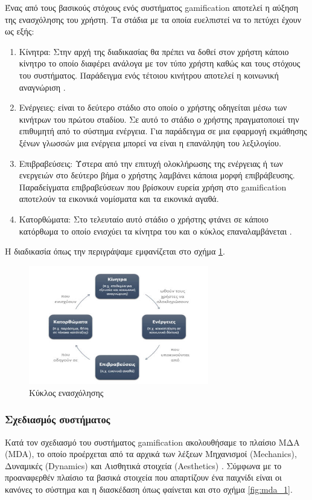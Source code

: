 		Ένας από τους βασικούς στόχους ενός συστήματος gamification αποτελεί η αύξηση της ενασχόλησης του χρήστη. Τα στάδια με τα οποία ευελπιστεί να το πετύχει έχουν ως εξής:
		\begin{enumerate}
			\item Κίνητρα: Στην αρχή της διαδικασίας θα πρέπει να δοθεί στον χρήστη κάποιο κίνητρο το οποίο διαφέρει ανάλογα με τον τύπο χρήστη καθώς και τους στόχους του συστήματος. Παράδειγμα ενός τέτοιου κινήτρου αποτελεί η κοινωνική αναγνώριση \cite{Gamification_on_Participation}.
			\item Ενέργειες: είναι το δεύτερο στάδιο στο οποίο ο χρήστης οδηγείται μέσω των κινήτρων του πρώτου σταδίου. Σε αυτό το στάδιο ο χρήστης πραγματοποιεί την επιθυμητή από το σύστημα ενέργεια. Για παράδειγμα σε μια εφαρμογή εκμάθησης ξένων γλωσσών μια ενέργεια μπορεί να είναι η επανάληψη του λεξιλογίου.
			\item Επιβραβεύσεις: Ύστερα από την επιτυχή ολοκλήρωσης της ενέργειας ή των ενεργειών στο δεύτερο βήμα ο χρήστης λαμβάνει κάποια μορφή επιβράβευσης. Παραδείγματα επιβραβεύσεων που βρίσκουν ευρεία χρήση στο gamification αποτελούν τα εικονικά νομίσματα και τα εικονικά αγαθά.
			\item Κατορθώματα: Στο τελευταίο αυτό στάδιο ο χρήστης φτάνει σε κάποιο κατόρθωμα το οποίο ενισχύει τα κίνητρα του και ο κύκλος επαναλαμβάνεται \cite{GamificationDesign}.
		\end{enumerate}
		Η διαδικασία όπως την περιγράψαμε εμφανίζεται στο σχήμα \ref{fig:engagement_loop}.
		\begin{figure}[h]
		    \centering
		    \includegraphics[width=0.7\textwidth]{engagement_loop.jpg}
		    \caption{Κύκλος ενασχόλησης}
		    \label{fig:engagement_loop}
		\end{figure}

	
	\subsubsection{Σχεδιασμός συστήματος}	
		Κατά τον σχεδιασμό του συστήματος gamification ακολουθήσαμε το πλαίσιο ΜΔΑ (MDA), το οποίο προέρχεται από τα αρχικά των λέξεων Μηχανισμοί (Mechanics), Δυναμικές (Dynamics) και Αισθητικά στοιχεία (Aesthetics) \cite{citeulike:382810}. Σύμφωνα με το προαναφερθέν πλαίσιο τα βασικά στοιχεία που απαρτίζουν ένα παιχνίδι είναι οι κανόνες το σύστημα και η διασκέδαση όπως φαίνεται και στο σχήμα \ref{fig:mda_1}.
	

